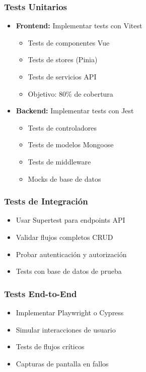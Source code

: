 \documentclass[12pt,a4paper]{article}
\begin{document}
\subsubsection{Tests Unitarios}

\begin{itemize}
    \item \textbf{Frontend:} Implementar tests con Vitest
    \begin{itemize}
        \item Tests de componentes Vue
        \item Tests de stores (Pinia)
        \item Tests de servicios API
        \item Objetivo: 80\% de cobertura
    \end{itemize}
    
    \item \textbf{Backend:} Implementar tests con Jest
    \begin{itemize}
        \item Tests de controladores
        \item Tests de modelos Mongoose
        \item Tests de middleware
        \item Mocks de base de datos
    \end{itemize}
\end{itemize}

\subsubsection{Tests de Integración}

\begin{itemize}
    \item Usar Supertest para endpoints API
    \item Validar flujos completos CRUD
    \item Probar autenticación y autorización
    \item Tests con base de datos de prueba
\end{itemize}

\subsubsection{Tests End-to-End}

\begin{itemize}
    \item Implementar Playwright o Cypress
    \item Simular interacciones de usuario
    \item Tests de flujos críticos
    \item Capturas de pantalla en fallos
\end{itemize}
\end{document}
